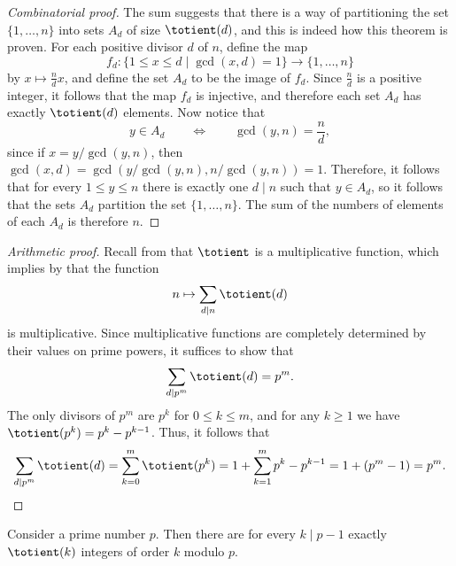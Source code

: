 \begin{proof}[Combinatorial proof]
  The sum suggests that there is a way of partitioning the set $\{1,\ldots,n\}$ into sets $A_d$ of size $\totient(d)$, and this is indeed how this theorem is proven. For each positive divisor $d$ of $n$, define the map
  \begin{equation*}
    f_d:{\textstyle \{1\leq x\leq  d \mid \gcd(x,d) = 1\}} \to \{1,\ldots,n\}
  \end{equation*}
  by $x\mapsto \frac{n}{d}x$, and define the set $A_d$ to be the image of $f_d$. Since $\frac{n}{d}$ is a positive integer, it follows that the map $f_d$ is injective, and therefore each set $A_d$ has exactly $\totient(d)$ elements. Now notice that
  \begin{equation*}
    y\in A_d \qquad\Leftrightarrow\qquad \gcd(y,n)=\frac{n}{d},
  \end{equation*}
  since if $x=y/\gcd(y,n)$, then $\gcd(x,d)=\gcd(y/\gcd(y,n),n/\gcd(y,n))=1$.
  Therefore, it follows that for every $1\leq y\leq n$ there is exactly one $d\mid n$ such that $y\in A_d$, so it follows that the sets $A_d$ partition the set $\{1,\ldots,n\}$. The sum of the numbers of elements of each $A_d$ is therefore $n$.
\end{proof}

\begin{proof}[Arithmetic proof]
  Recall from  that $\totient$ is a multiplicative function, which implies by  that the function
  \begin{equation*}
    n\mapsto \sum_{d\mid n}\totient(d)
  \end{equation*}
  is multiplicative. Since multiplicative functions are completely determined by their values on prime powers, it suffices to show that
  \begin{equation*}
    \sum_{d\mid p^m}\totient(d)=p^m.
  \end{equation*}
  The only divisors of $p^m$ are $p^k$ for $0\leq k\leq m$, and for any $k\geq 1$ we have $\totient(p^k)=p^k-p^{k-1}$. Thus, it follows that
  \begin{equation*}
    \sum_{d\mid p^m}\totient(d) = \sum_{k=0}^m\totient(p^k)= 1+\sum_{k=1}^m p^k-p^{k-1}=1+(p^m-1)=p^m.\qedhere
  \end{equation*}
\end{proof}

\begin{theorem}\label{theorem:count-integers-of-order-mod-prime}
  Consider a prime number $p$. Then there are for every $k\mid p-1$ exactly $\totient(k)$ integers of order $k$ modulo $p$.
\end{theorem}


